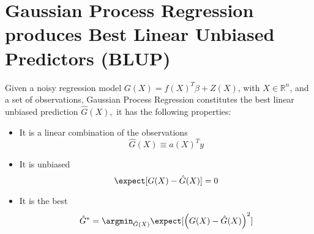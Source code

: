 \section{Gaussian Process Regression produces Best Linear Unbiased Predictors (BLUP)}
\label{app:blup}


\begin{theorem}
    Given a noisy regression model $G(X)=f(X)^T\beta + Z(X)$, with $X\in \mathbb{R}^n$, and a set of observations, Gaussian Process Regression constitutes the best linear unbiased prediction $\hat{G}(X)$,~\ie it has the following properties:
    \begin{itemize}
        \item It is a linear combination of the observations
        \begin{equation}
            \hat{G}(X)\equiv a(X)^Ty
        \end{equation}
        \item It is unbiased
        \begin{equation}
            \expect[G(X)-\hat{G}(X)] = 0
        \end{equation}
        \item It is the best
        \begin{equation}
            \hat{G}^*=\argmin_{\hat{G}(X)}\expect[\left(G(X)-\hat{G}(X)\right)^2]
        \end{equation}
    \end{itemize}
\end{theorem}
